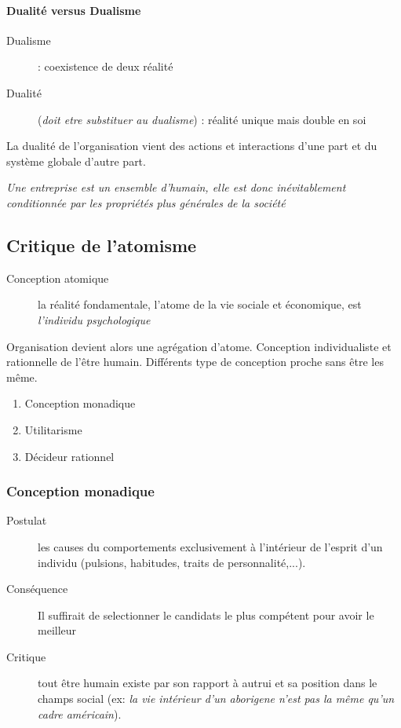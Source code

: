 \documentclass[11pt]{article} %
\begin{document}
\paragraph{Dualité  versus  Dualisme}  
\begin{description}
    \item[Dualisme] : coexistence de deux réalité
    \item[Dualité] (\textit{doit etre substituer au dualisme}) : réalité
        unique mais double en soi
\end{description}

La dualité de l'organisation vient des actions et interactions d'une
part et du système globale d'autre part.

\textit{Une entreprise est un ensemble d'humain, elle est donc
inévitablement conditionnée par les propriétés plus générales de la
société}


\subsection{Critique de l'atomisme}

\begin{description}
\item[Conception atomique] la réalité fondamentale, l'atome de la vie sociale et économique, est \textit{l'individu psychologique}
\end{description}

		Organisation devient alors une agrégation d'atome. Conception individualiste et rationnelle de l'être 
		humain. Différents type de conception proche sans être les même.
\begin{enumerate}
\item Conception monadique
\item Utilitarisme
\item Décideur rationnel
\end{enumerate}

\subsubsection{Conception monadique}

\begin{description}
\item[Postulat] les causes du comportements exclusivement à l'intérieur de l'esprit d'un individu (pulsions, habitudes, traits de personnalité,...).
\item[Conséquence] Il suffirait de selectionner le candidats le plus compétent pour avoir le meilleur
\item[Critique] tout être humain existe par son rapport à autrui et sa position dans le champs social (ex: \textit{la vie intérieur d'un aborigene n'est pas la même qu'un cadre américain}).
\end{description}
\end{document}
